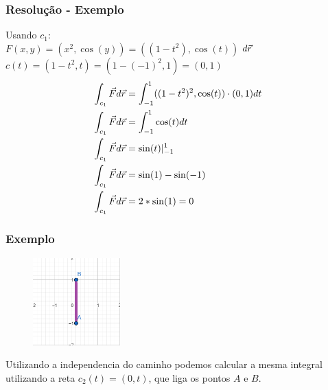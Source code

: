 \documentclass{beamer}
\def\vec{\mathaccent "017E\relax }
\begin{document}
\begin{frame}
    \frametitle{Resolução - Exemplo} 
    Usando $ c_1 $: \\
    
    $ F(x, y) = ( x^2, \cos(y) ) = (( 1 - t^2 ), \cos(t) ) $
    \hfill \break
    $ d\vec{r} $
    \hfill \break
    $ c(t) = ( 1 - t^2, t ) = ( 1 - (-1)^2 , 1) = ( 0, 1 ) $
    \hfill \break
    \begin{align*}   
    \int_{c_1} \vec{F} d\vec{r} &= \int_{-1}^1 (( 1 - t^2)^2, \cos(t) ) \cdot ( 0, 1 ) dt \\
    \int_{c_1} \vec{F} d\vec{r} &= \int_{-1}^1 \cos(t) dt  \\
    \int_{c_1} \vec{F} d\vec{r} &= \sin(t)\vert_{-1}^{1} \\
    \int_{c_1} \vec{F} d\vec{r} &= \sin(1) - \sin(-1) \\
    \int_{c_1} \vec{F} d\vec{r} &= 2 * \sin(1) = 0 \\
    \end{align*}
\end{frame}

\begin{frame}
    \frametitle{Exemplo} 

    \begin{figure} %
        \vspace{-35pt}
        \centering
        \caption{}
        \includegraphics[width=0.30\textwidth]{grafico-exemplo-2.png}
        \label{fig:grafico-exemplo1}
    \end{figure}

    Utilizando a independencia do caminho podemos calcular a mesma integral utilizando 
    a reta $ c_2(t) = ( 0, t) $, que liga os pontos $ A $ e $ B $.

\end{frame}
\end{document}
